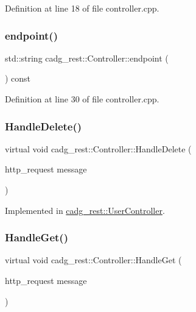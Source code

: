 Definition at line 18 of file controller.\+cpp.

\mbox{\label{classcadg__rest_1_1_controller_addeea914faab4557cc7caa493fce1d2d}} 
\subsubsection{\texorpdfstring{endpoint()}{endpoint()}\hspace{0.1cm}{\footnotesize\ttfamily [2/2]}}
{\footnotesize\ttfamily std\+::string cadg\+\_\+rest\+::\+Controller\+::endpoint (\begin{DoxyParamCaption}{ }\end{DoxyParamCaption}) const}



Definition at line 30 of file controller.\+cpp.

\mbox{\label{classcadg__rest_1_1_controller_a2aa889f1ffb53c6118667f1acf45d611}} 
\subsubsection{\texorpdfstring{HandleDelete()}{HandleDelete()}}
{\footnotesize\ttfamily virtual void cadg\+\_\+rest\+::\+Controller\+::\+Handle\+Delete (\begin{DoxyParamCaption}\item[{http\+\_\+request}]{message }\end{DoxyParamCaption})\hspace{0.3cm}{\ttfamily [pure virtual]}}



Implemented in \mbox{\hyperlink{classcadg__rest_1_1_user_controller_a99ed4e9459766b3e000814b503378a2d}{cadg\+\_\+rest\+::\+User\+Controller}}.

\mbox{\label{classcadg__rest_1_1_controller_a7166c6b459b4886ec477abd9dee06159}} 
\subsubsection{\texorpdfstring{HandleGet()}{HandleGet()}}
{\footnotesize\ttfamily virtual void cadg\+\_\+rest\+::\+Controller\+::\+Handle\+Get (\begin{DoxyParamCaption}\item[{http\+\_\+request}]{message }\end{DoxyParamCaption})\hspace{0.3cm}{\ttfamily [pure virtual]}}



